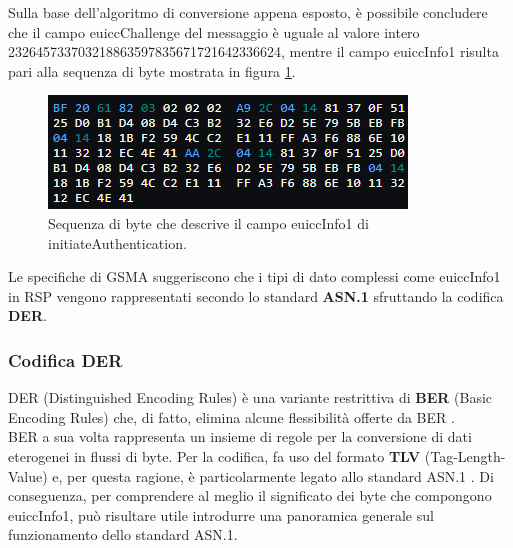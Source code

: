 \documentclass[10pt, oneside]{book}
\begin{document}
Sulla base dell'algoritmo di conversione appena esposto, è possibile concludere che il campo euiccChallenge del messaggio è uguale al valore intero 232645733703218863597835671721642336624, mentre il campo euiccInfo1 risulta pari alla sequenza di byte mostrata in figura \ref{fig:asn1-euiccInfo1}.\\
\begin{figure}
\includegraphics[width=\linewidth]{asn1-euiccInfo1.png}
\caption{Sequenza di byte che descrive il campo euiccInfo1 di initiateAuthentication.}
\label{fig:asn1-euiccInfo1}
\end{figure}
Le specifiche di GSMA \cite{GSMA-docs-new} suggeriscono che i tipi di dato complessi come euiccInfo1 in RSP vengono rappresentati secondo lo standard \textbf{ASN.1} sfruttando la codifica \textbf{DER}.

\subsubsection{Codifica DER}
DER (Distinguished Encoding Rules) è una variante restrittiva di \textbf{BER} (Basic Encoding Rules) che, di fatto, elimina alcune flessibilità offerte da BER \cite{DER}.\\
BER a sua volta rappresenta un insieme di regole per la conversione di dati eterogenei in flussi di byte. Per la codifica, fa uso del formato \textbf{TLV} (Tag-Length-Value) e, per questa ragione, è particolarmente legato allo standard ASN.1 \cite{BER}. Di conseguenza, per comprendere al meglio il significato dei byte che compongono euiccInfo1, può risultare utile introdurre una panoramica generale sul funzionamento dello standard ASN.1.
\end{document}
